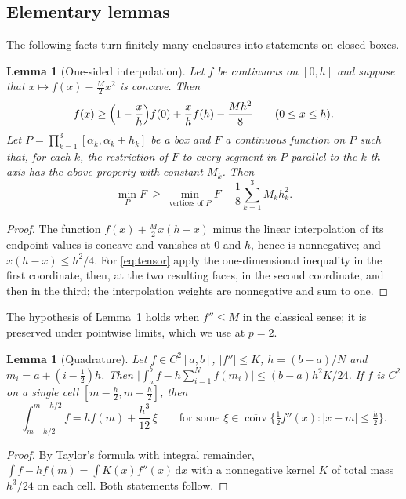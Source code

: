 \documentclass[11pt]{amsart}
\newtheorem{lemma}[theorem]{Lemma}
\theoremstyle{definition}
\theoremstyle{remark}
\numberwithin{equation}{section}
\newcommand{\dd}{\,\mathrm{d}}
\begin{document}
\subsection{Elementary lemmas}
The following facts turn finitely many enclosures into statements on closed boxes.

\begin{lemma}[One-sided interpolation]\label{lem:interp}
Let $f$ be continuous on $[0,h]$ and suppose that $x\mapsto f(x)-\frac M2x^2$ is concave. Then
\[
f(x)\ge\Bigl(1-\frac xh\Bigr)f(0)+\frac xhf(h)-\frac{Mh^2}{8}\qquad(0\le x\le h).
\]
Let $P=\prod_{k=1}^3[\alpha_k,\alpha_k+h_k]$ be a box and $F$ a continuous function on $P$ such that, for each $k$, the restriction of $F$ to every segment in $P$ parallel to the $k$-th axis has the above property with constant $M_k$. Then
\begin{equation}\label{eq:tensor}
\min_PF\ \ge\ \min_{\text{vertices of }P}F-\frac18\sum_{k=1}^3M_kh_k^2.
\end{equation}
\end{lemma}

\begin{proof}
The function $f(x)+\frac M2x(h-x)$ minus the linear interpolation of its endpoint values is concave and vanishes at $0$ and $h$, hence is nonnegative; and $x(h-x)\le h^2/4$. For \eqref{eq:tensor} apply the one-dimensional inequality in the first coordinate, then, at the two resulting faces, in the second coordinate, and then in the third; the interpolation weights are nonnegative and sum to one.
\end{proof}

The hypothesis of Lemma~\ref{lem:interp} holds when $f''\le M$ in the classical sense; it is preserved under pointwise limits, which we use at $p=2$.

\begin{lemma}[Quadrature]\label{lem:quad}
Let $f\in C^2[a,b]$, $|f''|\le K$, $h=(b-a)/N$ and $m_i=a+(i-\frac12)h$. Then $\bigl|\int_a^bf-h\sum_{i=1}^Nf(m_i)\bigr|\le (b-a)h^2K/24$. If $f$ is $C^2$ on a single cell $[m-\frac h2,m+\frac h2]$, then
\[
\int_{m-h/2}^{m+h/2}f=h f(m)+\frac{h^3}{12}\,\xi\qquad\text{for some }\xi\in\overline{\operatorname{conv}}\{\tfrac12f''(x):|x-m|\le\tfrac h2\}.
\]
\end{lemma}

\begin{proof}
By Taylor's formula with integral remainder, $\int f-hf(m)=\int K(x)f''(x)\dd x$ with a nonnegative kernel $K$ of total mass $h^3/24$ on each cell. Both statements follow.
\end{proof}
\end{document}
